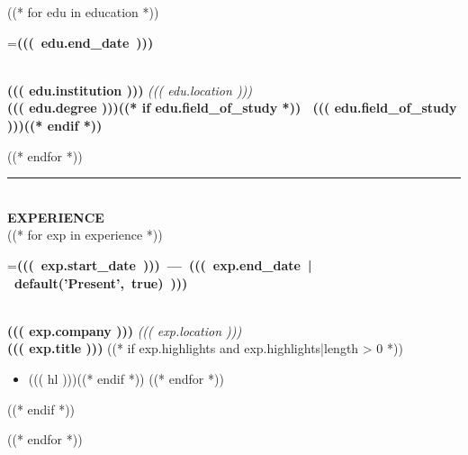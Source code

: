\documentclass[11pt,a4paper]{article}
\begin{document}
\begin{minipage}[t]{\textwidth}
\begin{minipage}[t]{0.9\textwidth}
\begin{minipage}[t]{0.68\textwidth}
((* for edu in education *))
\hspace{15pt}
\begin{minipage}{0.9\linewidth}
{\scriptsize\color{white}=\hbox{\textbf{((( edu.end_date )))}} }\\[4pt]
{\fontsize{10}{12}\selectfont\bfseries ((( edu.institution )))} \hfill {\scriptsize\color{teal-pri}\textit{((( edu.location )))}} \\
{\fontsize{9}{11}\selectfont\bfseries ((( edu.degree )))((* if edu.field_of_study *)) \textbar\ ((( edu.field_of_study )))((* endif *))}
\end{minipage}
\vspace{15pt}
((* endfor *))

\vspace{10pt}

{\color{teal-pri}\rule{\linewidth}{1.5pt}}\\[2pt]
{\fontsize{10}{12}\selectfont\color{teal-pri}\bfseries EXPERIENCE}\\[15pt]

((* for exp in experience *))
\hspace{15pt}
\begin{minipage}{0.92\linewidth}
{\scriptsize\color{white}=\hbox{\textbf{((( exp.start_date ))) --- ((( exp.end_date | default('Present', true) )))}} }\\[4pt]
{\fontsize{10}{12}\selectfont\bfseries ((( exp.company )))} \hfill {\scriptsize\color{teal-pri}\textit{((( exp.location )))}} \\
{\fontsize{9}{11}\selectfont\bfseries ((( exp.title )))}
((* if exp.highlights and exp.highlights|length > 0 *))
\begin{itemize}[leftmargin=12pt, itemsep=2pt, parsep=0pt, topsep=4pt]
((* for hl in exp.highlights *))((* if hl *))\item {\fontsize{8.5}{11.5}\selectfont ((( hl )))}((* endif *))
((* endfor *))
\end{itemize}
((* endif *))
\end{minipage}
\vspace{15pt}
((* endfor *))


\end{minipage}
\end{minipage}
\end{minipage}
\end{document}
